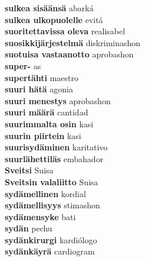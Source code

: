 \textbf{ sulkea sisäänsä  } abarká \\
\textbf{ sulkea ulkopuolelle  } evitá \\
\textbf{ suoritettavissa oleva  } realisabel \\
\textbf{ suosikkijärjestelmä  } diskriminashon \\
\textbf{ suotuisa vastaanotto  } aprobashon \\
\textbf{ super-  } as \\
\textbf{ supertähti  } maestro \\
\textbf{ suuri hätä  } agonia \\
\textbf{ suuri menestys  } aprobashon \\
\textbf{ suuri määrä  } cantidad \\
\textbf{ suurimmalta osin  } kasi \\
\textbf{ suurin piirtein  } kasi \\
\textbf{ suurisydäminen  } karitativo \\
\textbf{ suurlähettiläs  } embahador \\
\textbf{ Sveitsi  } Suisa \\
\textbf{ Sveitsin valaliitto  } Suisa \\
\textbf{ sydämellinen  } kordial \\
\textbf{ sydämellisyys  } stimashon \\
\textbf{ sydämensyke  } bati \\
\textbf{ sydän  } pechu \\
\textbf{ sydänkirurgi  } kardiólogo \\
\textbf{ sydänkäyrä  } cardiogram \\
